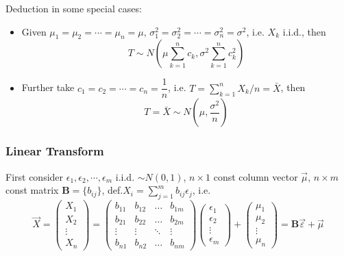     Deduction in some special cases:
    \begin{itemize}
        \item Given $\mu_1=\mu_2=\cdots=\mu_n=\mu,\, \sigma^2_1=\sigma^2_2=\cdots=\sigma^2_n=\sigma^2$, i.e. $X_k$ i.i.d., then
        \begin{equation}\label{EqaDistributionOfSumOfiidNormal}
            T\sim   N(\mu\sum_{k=1}^n c_k,\sigma^2\sum_{k=1}^n c_k^2) 
        \end{equation}
        \item Further take $c_1=c_2=\cdots=c_n=\dfrac{1}{n}$, i.e. $T={\displaystyle \sum_{k=1}^n X_k /n}=\bar{X}$, then
        \begin{equation}    
            T=\bar{X}\sim N(\mu,\frac{\sigma^2}{n})    
        \end{equation}
    \end{itemize}





\subsubsection{Linear Transform}
    First consider $\epsilon_1,\epsilon_2,\cdots,\epsilon_m$ i.i.d. $\sim N(0,1)$, $n\times 1$ const column vector $\vec{\mu}$, $n\times m$ const matrix $\bm{B}=\{b_{ij}\}$, def.$X_i={\displaystyle\sum_{j=1}^m b_{ij}\epsilon_j}$, i.e.
    \begin{equation}
        \vec{X}=
        \begin{pmatrix}
            X_1\\X_2\\ \vdots\\X_n
        \end{pmatrix}
        =
        \begin{pmatrix}
            b_{11}&b_{12}&\ldots&b_{1m}\\
            b_{21}&b_{22}&\ldots&b_{2m}\\
            \vdots&\vdots&\ddots&\vdots\\
            b_{n1}&b_{n2}&\ldots&b_{nm}
        \end{pmatrix}
        \begin{pmatrix}
            \epsilon_1\\
            \epsilon_2\\
            \vdots\\
            \epsilon_m
        \end{pmatrix}
        +\begin{pmatrix}
            \mu _1\\\mu _2\\ \vdots\\\mu _n
        \end{pmatrix}=\bm{B}\vec{\varepsilon }+\vec{\mu }
    \end{equation}


